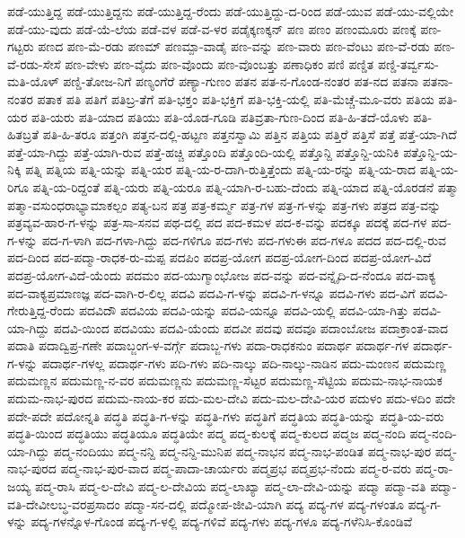 ಪಡೆ-ಯುತ್ತಿದ್ದ
ಪಡೆ-ಯುತ್ತಿದ್ದನು
ಪಡೆ-ಯುತ್ತಿದ್ದ-ರೆಂದು
ಪಡೆ-ಯುತ್ತಿದ್ದು-ದ-ರಿಂದ
ಪಡೆ-ಯುವ
ಪಡೆ-ಯು-ವಲ್ಲಿಯೇ
ಪಡೆ-ಯು-ವುದು
ಪಡೆ-ಯೆ-ಲೆಯ
ಪಡೆ-ವಳ
ಪಡೆ-ವ-ಳರ
ಪಡೈಕ್ಕಣಕ್ಕನ್
ಪಣ
ಪಣಂ
ಪಣಂಮೂರು
ಪಣಕ್ಕೆ
ಪಣ-ಗಟ್ಟರು
ಪಣದ
ಪಣ-ಮೆ-ರಡು
ಪಣಮ್
ಪಣಮ್ಪಾ-ವಾಡೈ
ಪಣ-ವನ್ನು
ಪಣ-ವಾರು
ಪಣ-ವೆಂಟು
ಪಣ-ವೆ-ರಡು
ಪಣ-ವೆ-ರಡು-ಸೇಸೆ
ಪಣ-ವೇಳು
ಪಣ-ವೈದು
ಪಣ-ವೊಂದು
ಪಣ-ವೊಂಬತ್ತು
ಪಣಾಧಿಕಂ
ಪಣಿ
ಪಣ್ಡಿತ
ಪಣ್ಡಿ-ತರ್ವ್ವಸು-ಮತಿ-ಯೊಳ್
ಪಣ್ಡಿ-ತೋಜ-ನಿಗೆ
ಪಣ್ಯಂಗೆರೆ
ಪಣ್ಯಾ-ಗುಣಂ
ಪತನ
ಪತ-ನ-ಗೊಂಡ-ನಂತರ
ಪತ-ನದ
ಪತನಾ
ಪತನಾ-ನಂತರ
ಪತಾಕ
ಪತಿ
ಪತಿಗೆ
ಪತಿಬ್ರ-ತೆಗೆ
ಪತಿ-ಭಕ್ತಂ
ಪತಿ-ಭಕ್ತಿಗೆ
ಪತಿ-ಭಕ್ತಿ-ಯಲ್ಲಿ
ಪತಿ-ಮೆಚ್ಚೆ-ಮೂ-ವರು
ಪತಿಯ
ಪತಿ-ಯರ
ಪತಿ-ಯರು
ಪತಿ-ಯಾದ
ಪತಿಯು
ಪತಿ-ಯೊಡ-ಗೂಡಿ
ಪತಿವ್ರತಾ-ಗುಣ-ದಿಂದ
ಪತಿ-ಹಿ-ತದೆ-ಯೊಳು
ಪತಿ-ಹಿತಬ್ರತೆ
ಪತಿ-ಹಿ-ತರೂ
ಪತ್ತಂಗಿ
ಪತ್ತನ-ದಲ್ಲಿ-ಹಟ್ಟಣ
ಪತ್ತನಸ್ವಾಮಿ
ಪತ್ತಿನ
ಪತ್ತಿಯ
ಪತ್ತಿರೆ
ಪತ್ತಿಸೆ
ಪತ್ತೆ
ಪತ್ತೆ-ಯಾ-ಗಿದೆ
ಪತ್ತೆ-ಯಾ-ಗಿದ್ದು
ಪತ್ತೆ-ಯಾಗಿ-ರುವ
ಪತ್ತೆ-ಹಚ್ಚಿ
ಪತ್ತೊಂದಿ
ಪತ್ತೊಂದಿ-ಯಲ್ಲಿ
ಪತ್ತೊನ್ದಿ
ಪತ್ತೊನ್ದಿ-ಯನಿಕಿ
ಪತ್ತೊನ್ದಿ-ಯ-ನಿಕ್ಕಿ
ಪತ್ನಿ
ಪತ್ನಿಯ
ಪತ್ನಿ-ಯನ್ನು
ಪತ್ನಿ-ಯರ
ಪತ್ನಿ-ಯ-ರ-ದಾಗಿ-ರುತ್ತಿತ್ತೆಂದು
ಪತ್ನಿ-ಯ-ರನ್ನು
ಪತ್ನಿ-ಯ-ರಾದ
ಪತ್ನಿ-ಯ-ರಿಗೂ
ಪತ್ನಿ-ಯ-ರಿದ್ದಂತೆ
ಪತ್ನಿ-ಯರು
ಪತ್ನಿ-ಯರೂ
ಪತ್ನಿ-ಯಾಗಿ-ರ-ಬಹು-ದೆಂದು
ಪತ್ನಿ-ಯಾದ
ಪತ್ನಿ-ಯೊರಡನೆ
ಪತ್ಮಾ
ಪತ್ಮಾ-ವಸುಂಧರಾಭ್ಯಾಮಾಕಲ್ಪಂ
ಪತ್ಯ-ಬನ
ಪತ್ರ
ಪತ್ರ-ಕರ್ಮ್ಮ
ಪತ್ರ-ಗಳ
ಪತ್ರ-ಗ-ಳನ್ನು
ಪತ್ರ-ಗಳು
ಪತ್ರದ
ಪತ್ರ-ವನ್ನು
ಪತ್ರವ್ಯವ-ಹಾರ-ಗ-ಳನ್ನು
ಪತ್ರ-ಸಾ-ಸನವ
ಪಥ-ದಲ್ಲಿ
ಪದ
ಪದ-ಕಮಳ
ಪದ-ಕ-ವನ್ನು
ಪದಕ್ಕೂ
ಪದಕ್ಕೆ
ಪದ-ಗಳ
ಪದ-ಗ-ಳನ್ನು
ಪದ-ಗ-ಳಾಗಿ
ಪದ-ಗಳಾ-ಗಿದ್ದು
ಪದ-ಗಳಿಗೂ
ಪದ-ಗಳು
ಪದ-ಗಳುಈ
ಪದ-ಗಳೂ
ಪದದ
ಪದ-ದಲ್ಲಿ-ರುವ
ಪದ-ದಿಂದ
ಪದ-ಪದ್ಮಾ-ರಾಧಕ-ರು-ಮಪ್ಪ
ಪದಪಿಂ
ಪದಪ್ರ-ಯೋಗ
ಪದಪ್ರ-ಯೋಗ-ದಿಂದ
ಪದಪ್ರ-ಯೋಗ-ವಿದೆ
ಪದಪ್ರ-ಯೋಗ-ವಿದೆ-ಯೆಂದು
ಪದಮಂ
ಪದ-ಯುಗ್ಮಾಂಭೋಜ
ಪದ-ವನ್ನು
ಪದ-ವನ್ನೈದಿ-ದ-ನೆಂದೂ
ಪದ-ವಾಕ್ಯ
ಪದ-ವಾಕ್ಯಪ್ರಮಾಣಜ್ಞ
ಪದ-ವಾಗಿ-ರ-ಲಿಲ್ಲ
ಪದವಿ
ಪದವಿ-ಗ-ಳನ್ನು
ಪದವಿ-ಗ-ಳನ್ನೂ
ಪದವಿ-ಗಳು
ಪದ-ವಿಗೆ
ಪದವಿ-ಗೇರುತ್ತಿದ್ದ-ರೆಂದು
ಪದವಿದೌ
ಪದವಿಯ
ಪದವಿ-ಯನ್ನು
ಪದವಿ-ಯನ್ನೂ
ಪದವಿ-ಯಲ್ಲಿ
ಪದವಿ-ಯಾ-ಗಿತ್ತು
ಪದವಿ-ಯಾ-ಗಿದ್ದು
ಪದವಿ-ಯಿಂದ
ಪದವಿಯು
ಪದವಿ-ಯೆಂದು
ಪದವೀ
ಪದವು
ಪದವೂ
ಪದಾಂಬೋಜ
ಪದಾಕ್ರಾಂತ-ವಾದ
ಪದಾತಿ
ಪದಾದ್ವಿಪ್ರ-ಗಣೇ
ಪದಾಬ್ಜಂಗ-ಳ-ವರ್ಗ್ಗೆ
ಪದಾಬ್ಜ-ಗಳು
ಪದಾ-ರಾಧಕನುಂ
ಪದಾರ್ಥ
ಪದಾರ್ಥ-ಗಳ
ಪದಾರ್ಥ-ಗ-ಳನ್ನು
ಪದಾರ್ಥ-ಗಳಲ್ಲ
ಪದಾರ್ಥ-ಗಳು
ಪದಿ-ಗಳು
ಪದಿ-ನಾಲ್ಕು
ಪದಿ-ನಾಲ್ಕು-ನಾಡಿನ
ಪದು-ಮಂಣನ
ಪದುಮಣ್ಣ
ಪದುಮಣ್ಣನ
ಪದುಮಣ್ಣ-ನ-ವರ
ಪದುಮಣ್ಣನು
ಪದುಮಣ್ಣ-ಸೆಟ್ಟರ
ಪದುಮಣ್ಣ-ಸೆಟ್ಟಿಯ
ಪದುಮ-ನಾಭ-ನಾಯಕ
ಪದುಮ-ನಾಭ-ಪುರದ
ಪದುಮ-ನಾಯ-ಕರ
ಪದು-ಮಲ-ದೇವಿ
ಪದು-ಮಲ-ದೇವಿ-ಯರ
ಪದುಳಂ
ಪದು-ಳದಿಂ
ಪದೇ
ಪದೇ-ಪದೇ
ಪದೋನ್ನತಿ
ಪದ್ಧತಿ
ಪದ್ಧತಿ-ಗ-ಳನ್ನು
ಪದ್ಧತಿ-ಗಳು
ಪದ್ಧತಿಗೆ
ಪದ್ಧತಿಯ
ಪದ್ಧತಿ-ಯನ್ನು
ಪದ್ಧತಿ-ಯ-ವರು
ಪದ್ಧತಿ-ಯಿಂದ
ಪದ್ಧತಿಯು
ಪದ್ಧತಿಯೂ
ಪದ್ಧತಿಯೇ
ಪದ್ಮ
ಪದ್ಮ-ಕುಲಕ್ಕೆ
ಪದ್ಮ-ಕುಲದ
ಪದ್ಮಜ
ಪದ್ಮ-ನಂದಿ
ಪದ್ಮ-ನಂದಿ-ಯಾ-ಗಿದ್ದು
ಪದ್ಮ-ನಂದಿಯು
ಪದ್ಮ-ನನ್ದಿ
ಪದ್ಮ-ನನ್ದಿ-ಮುನಿಪ
ಪದ್ಮ-ನಾಭನ
ಪದ್ಮ-ನಾಭ-ಪಂಡಿತ
ಪದ್ಮ-ನಾಭ-ಪುರ
ಪದ್ಮ-ನಾಭ-ಪುರದ
ಪದ್ಮ-ನಾಭ-ಪುರ-ವಾದ
ಪದ್ಮ-ಪಾದಾ-ಚಾರ್ಯರು
ಪದ್ಮಪ್ರಭ
ಪದ್ಮಪ್ರಭ-ನೆಂದು
ಪದ್ಮ-ರ-ವರು
ಪದ್ಮ-ರಾ-ಜಯ್ಯ
ಪದ್ಮ-ರಾಸಿ
ಪದ್ಮ-ಲ-ದೇವಿ
ಪದ್ಮ-ಲ-ದೇವಿಯ
ಪದ್ಮ-ಲಾಖ್ಯಾ
ಪದ್ಮ-ಲಾ-ದೇವಿ-ಯನ್ನು
ಪದ್ಮಾ
ಪದ್ಮಾ-ವತಿ
ಪದ್ಮಾ-ವತಿ-ದೇವೀಲಬ್ಧ-ವರಪ್ರಸಾದಂ
ಪದ್ಮಾ-ಸನ-ದಲ್ಲಿ
ಪದ್ಮೋಪ-ಜೀವಿ-ಯಾಗಿ
ಪದ್ಯ
ಪದ್ಯ-ಗಳ
ಪದ್ಯ-ಗಳಂತೂ
ಪದ್ಯ-ಗ-ಳನ್ನು
ಪದ್ಯ-ಗಳನ್ನೊಳ-ಗೊಂಡ
ಪದ್ಯ-ಗ-ಳಲ್ಲಿ
ಪದ್ಯ-ಗಳಿವೆ
ಪದ್ಯ-ಗಳು
ಪದ್ಯ-ಗಳೂ
ಪದ್ಯ-ಗಳೆನಿಸಿ-ಕೊಂಡಿವೆ
